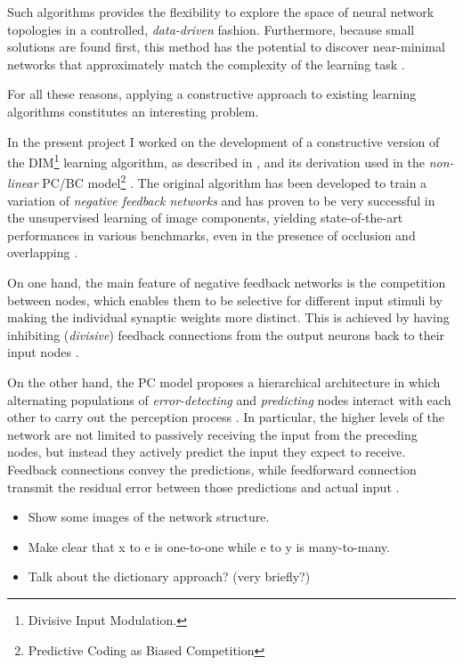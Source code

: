 \documentclass[11pt,a4paper]{report}
\begin{document}
		Such algorithms provides the flexibility to explore the space of neural network topologies in a controlled, \emph{data-driven} fashion. Furthermore, because small solutions are found first, this method has the potential to discover near-minimal networks that approximately match the complexity of the learning task \cite{parekh2000constructive}.
		
		For all these reasons, applying a constructive approach to existing learning algorithms constitutes an interesting problem.
		
		\newpage
		
		In the present project I worked on the development of a constructive version of the DIM\footnote{Divisive Input Modulation.} learning algorithm, as described in \cite{spratling2009unsupervised}, and its derivation \cite{spratling2012unsupervised} used in the \emph{non-linear} PC/BC model\footnote{Predictive Coding as Biased Competition} \cite{spratling2008predictive}. The original algorithm has been developed to train a variation of \emph{negative feedback networks} and has proven to be very successful in the unsupervised learning of image components, yielding state-of-the-art performances in various benchmarks, even in the presence of occlusion and overlapping \cite{spratling2009unsupervised}.
		
		On one hand, the main feature of negative feedback networks is the competition between nodes, which enables them to be selective for different input stimuli by making the individual synaptic weights more distinct. This is achieved by having inhibiting (\emph{divisive}) feedback connections from the output neurons back to their input nodes \cite{spratling2009unsupervised}. 
		
		On the other hand, the PC model proposes a hierarchical architecture in which alternating populations of \emph{error-detecting} and \emph{predicting} nodes interact with each other to carry out the perception process \cite{spratling2014predictive}. In particular, the higher levels of the network are not limited to passively receiving the input from the preceding nodes, but instead they actively predict the input they expect to receive. Feedback connections convey the predictions, while feedforward connection transmit the residual error between those predictions and actual input \cite{spratling2008predictive}.

		\begin{itemize}
			\item Show some images of the network structure.
			\item Make clear that x to e is one-to-one while e to y is many-to-many.
			\item Talk about the dictionary approach? (very briefly?)
		\end{itemize}
\end{document}
